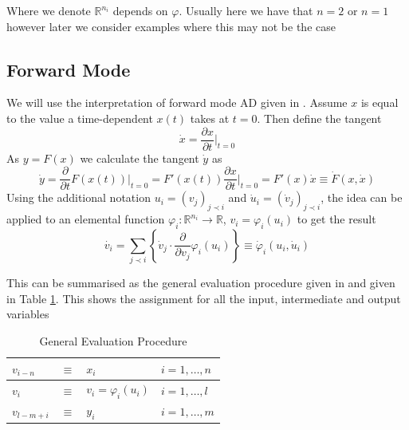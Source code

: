 \documentclass{article}
\begin{document}
Where we denote $\mathbb{R}^{n_i}$ depends on $\varphi$. Usually here we have that $n=2$ or $n=1$ however later we consider examples where this may not be the case

\subsection{Forward Mode}

We will use the interpretation of forward mode AD given in \cite{dhamarticle}. Assume $x$ is equal to the value a time-dependent $x(t)$ takes at $t=0$. Then define the tangent 
\begin{equation}
    \dot{x} = \frac{\partial x}{\partial t} \Big|_{t=0}
\end{equation}
As $y = F(x)$ we calculate the tangent $\dot{y}$ as
\begin{equation}
    \Dot{y} = \frac{\partial}{\partial t} F(x (t)) \Big|_{t=0} 
    = F'(x (t)) \frac{\partial x}{\partial t} \Big|_{t=0}
    = F'(x) \Dot{x}
    \equiv \Dot{F}(x, \Dot{x})
\end{equation}
Using the additional notation $u_i = (v_j)_{j \prec i}$ and $\Dot{u}_i = (\Dot{v}_j)_{j \prec i}$, the idea can be applied to an elemental function $\varphi_i : \mathbb{R}^{n_i} \longrightarrow \mathbb{R}$, $v_i = \varphi_i (u_i)$ to get the result
\begin{equation} \label{tangentequ}
    \Dot{v_i} = \sum_{j \prec i} \left\{ \Dot{v}_j \cdot \frac{\partial}{\partial v_j} \varphi_i (u_i) \right\} 
    \equiv \Dot{\varphi}_i(u_i, \Dot{u}_i)
\end{equation}

This can be summarised as the general evaluation procedure given in \cite{evald} and given in Table \ref{tab:gep}.
This shows the assignment for all the input, intermediate and output variables

\begin{table}[h]
    \centering
    \begin{tabular}{|lcll|}
        \hline
        $v_{i-n}$ & $\equiv$ & $x_i$ & $i = 1, \ldots, n$ \\
        \hline
        $v_{i}$ & $\equiv$ & $v_i = \varphi_i (u_i)$ & $i = 1, \ldots, l$ \\
        \hline
        $v_{l-m+i}$ & $\equiv$ & $y_i$ & $i = 1, \ldots, m$ \\
        \hline
    \end{tabular}
    \caption{General Evaluation Procedure}
    \label{tab:gep}
\end{table}
\end{document}
